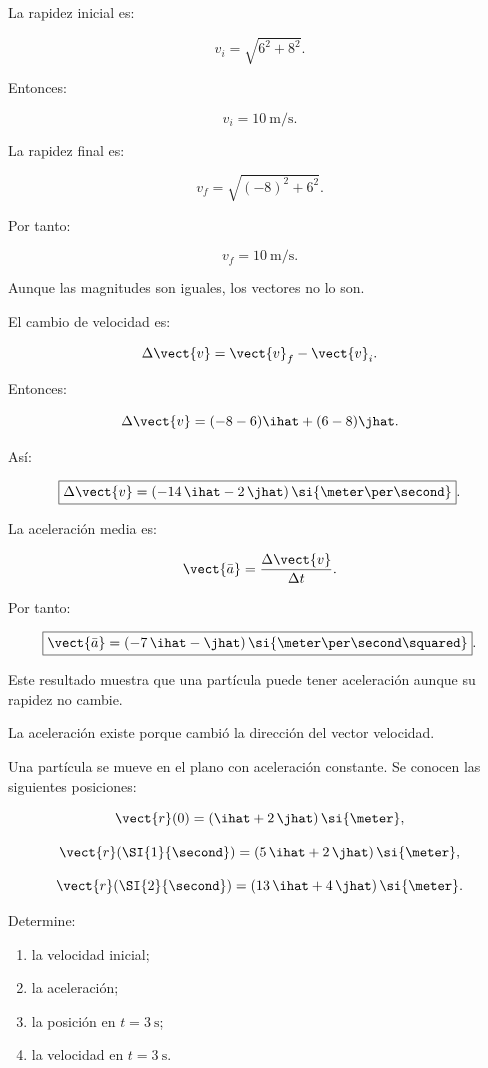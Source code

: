 \begin{explicacion}
La rapidez inicial es:

\[
v_i
=
\sqrt{6^2+8^2}.
\]

Entonces:

\[
\boxed{v_i=\SI{10}{\meter\per\second}}.
\]

La rapidez final es:

\[
v_f
=
\sqrt{(-8)^2+6^2}.
\]

Por tanto:

\[
\boxed{v_f=\SI{10}{\meter\per\second}}.
\]

Aunque las magnitudes son iguales, los vectores no lo son.

El cambio de velocidad es:

\[
\Delta\vect{v}
=
\vect{v}_f-\vect{v}_i.
\]

Entonces:

\[
\Delta\vect{v}
=
(-8-6)\ihat
+
(6-8)\jhat.
\]

Así:

\[
\boxed{
\Delta\vect{v}
=
(-14\,\ihat-2\,\jhat)\,
\si{\meter\per\second}
}.
\]

La aceleración media es:

\[
\vect{\bar{a}}
=
\frac{\Delta\vect{v}}{\Delta t}.
\]

Por tanto:

\[
\boxed{
\vect{\bar{a}}
=
(-7\,\ihat-\jhat)\,
\si{\meter\per\second\squared}
}.
\]

Este resultado muestra que una partícula puede tener aceleración aunque su rapidez no cambie.

La aceleración existe porque cambió la dirección del vector velocidad.
\end{explicacion}


\nivelavanzado


\begin{ejercicio}
Una partícula se mueve en el plano con aceleración constante. Se conocen las siguientes posiciones:

\[
\vect{r}(0)
=
(\ihat+2\,\jhat)\,\si{\meter},
\]

\[
\vect{r}(\SI{1}{\second})
=
(5\,\ihat+2\,\jhat)\,\si{\meter},
\]

\[
\vect{r}(\SI{2}{\second})
=
(13\,\ihat+4\,\jhat)\,\si{\meter}.
\]

Determine:

\begin{enumerate}[label=\alph*)]
    \item la velocidad inicial;
    \item la aceleración;
    \item la posición en \(t=\SI{3}{\second}\);
    \item la velocidad en \(t=\SI{3}{\second}\).
\end{enumerate}
\end{ejercicio}

